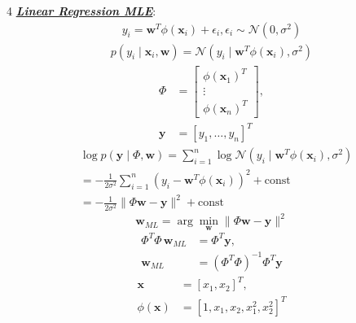 \documentclass[12pt]{article}
\newcommand{\bulletPoint}[1]{\ul{\textit{\textbf{#1}}}}
\begin{document}
\begin{multicols*}{4}
\bulletPoint{Linear Regression MLE}:
\useshortskip \begin{equation*}
    \begin{split}
        y_i=\mathbf{w}^T\phi(\mathbf{x}_i)+\epsilon_i, \epsilon_i\sim\mathcal{N}(0,\sigma^2)
    \end{split}
\end{equation*}
\useshortskip \begin{equation*}
    \begin{split}
        p(y_i\mid \mathbf{x}_i,\mathbf{w})=\mathcal{N}\!\left(
        y_i\mid \mathbf{w}^T\phi(\mathbf{x}_i),\sigma^2\right)
    \end{split}
\end{equation*}
\useshortskip \begin{equation*}
    \begin{split}
        \Phi&=
        \begin{bmatrix}
            \phi(\mathbf{x}_1)^T\\
            \vdots\\
            \phi(\mathbf{x}_n)^T
        \end{bmatrix},\\
        \mathbf{y}&=[y_1,\ldots,y_n]^T
    \end{split}
\end{equation*}
\useshortskip \begin{equation*}
    \begin{split}
        &\log p(\mathbf{y}\mid \Phi,\mathbf{w})
        =\sum_{i=1}^{n}\log \mathcal{N}\!\left(
        y_i\mid \mathbf{w}^T\phi(\mathbf{x}_i),\sigma^2\right) \\
        &=-\frac{1}{2\sigma^2}\sum_{i=1}^{n}
        \left(y_i-\mathbf{w}^T\phi(\mathbf{x}_i)\right)^2+\mathrm{const} \\
        &=-\frac{1}{2\sigma^2}\|\Phi\mathbf{w}-\mathbf{y}\|^2+\mathrm{const}
    \end{split}
\end{equation*}
\useshortskip \begin{equation*}
    \mathbf{w}_{ML}
    =\arg\min_{\mathbf{w}}\|\Phi\mathbf{w}-\mathbf{y}\|^2
\end{equation*}
\useshortskip \begin{equation*}
    \begin{split}
        \Phi^T\Phi\,\mathbf{w}_{ML}&=\Phi^T\mathbf{y},\\
        \mathbf{w}_{ML}&=(\Phi^T\Phi)^{-1}\Phi^T\mathbf{y}
    \end{split}
\end{equation*}
\useshortskip \begin{equation*}
    \begin{split}
        \mathbf{x}&=[x_1,x_2]^T,\\
        \phi(\mathbf{x})&=[1,x_1,x_2,x_1^2,x_2^2]^T
    \end{split}
\end{equation*}


\end{multicols*}
\end{document}
